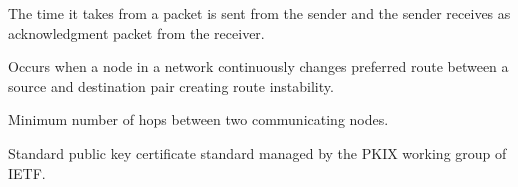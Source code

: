 \begin{acronym}
	The time it takes from a packet is sent from the sender and the sender receives as acknowledgment packet from the receiver.

		Occurs when a node in a network continuously changes preferred route between a source and destination pair creating route instability.


	Minimum number of hops between two communicating nodes.

	Standard public key certificate standard managed by the PKIX working group of IETF.

\end{acronym}
